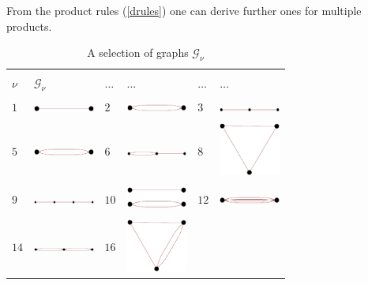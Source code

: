 \documentclass[aps,twocolumn,groupedaddress]{revtex4}
\begin{document}
From the product rules (\ref{drules}) one can derive further ones
for multiple products.

\begin{table}[ht]
\caption{A selection of graphs ${\mathcal G}_\nu$ \label{table1}}
\begin{center}
\begin{tabular}{||l|l||l|l||l|l||}
\hline \\
{$\nu$ }& ${\mathcal G}_\nu$ &$\ldots$ & $\ldots$ &$\ldots$ & $\ldots$ \\
\hline
\hline\\
 {$1$}  &{\includegraphics[width=2cm]{G1}} &$2$  &\includegraphics[width=2cm]{G2}
 &$3$  &\includegraphics[width=2cm]{G3} \\
\hline\\
$5$  &\includegraphics[width=2cm]{G5} &$6$
&\includegraphics[width=2cm]{G6}
 &$8$  &\includegraphics[width=2cm]{G8}  \\
\hline\\
$9$  &\includegraphics[width=2cm]{G9} &$10$
&\includegraphics[width=2cm]{G10}
 &$12$  &\includegraphics[width=2cm]{G12}   \\
\hline\\
$14$  &\includegraphics[width=2cm]{G14}&$16$
&\includegraphics[width=2cm]{G16}

\end{tabular}
\end{center}
\end{table}
\end{document}

